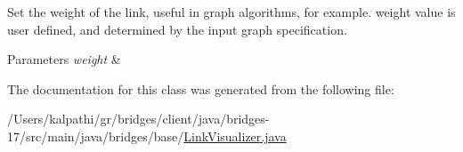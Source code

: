 Set the weight of the link, useful in graph algorithms, for example. weight value is user defined, and determined by the input graph specification.


\begin{DoxyParams}{Parameters}
{\em weight} & \\
\hline
\end{DoxyParams}


The documentation for this class was generated from the following file\+:\begin{DoxyCompactItemize}
\item 
/\+Users/kalpathi/gr/bridges/client/java/bridges-\/17/src/main/java/bridges/base/\mbox{\hyperlink{_link_visualizer_8java}{Link\+Visualizer.\+java}}\end{DoxyCompactItemize}
